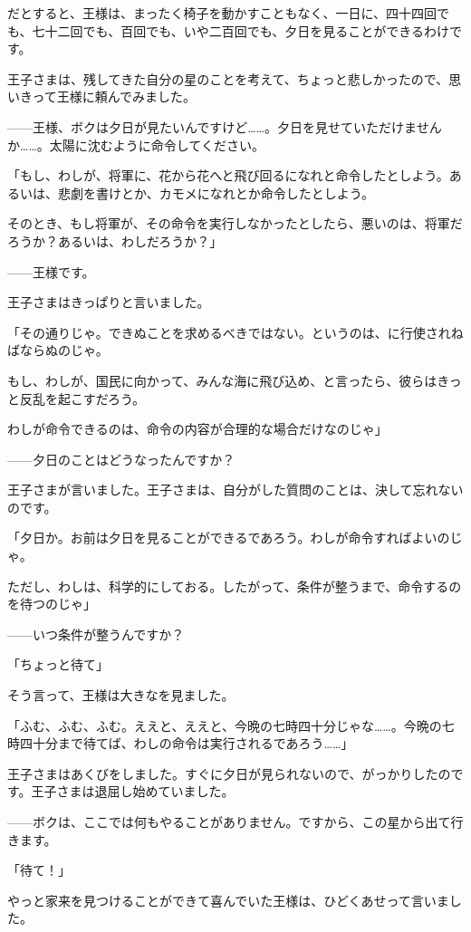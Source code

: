 だとすると、王様は、まったく椅子を動かすこともなく、一日に、四十四回でも、七十二回でも、百回でも、いや二百回でも、夕日を見ることができるわけです。

王子さまは、残してきた自分の星のことを考えて、ちょっと悲しかったので、思いきって王様に頼んでみました。

——王様、ボクは夕日が見たいんですけど……。夕日を見せていただけませんか……。太陽に沈むように命令してください。

「もし、わしが、将軍に、花から花へと飛び回るになれと命令したとしよう。あるいは、悲劇を書けとか、カモメになれとか命令したとしよう。

そのとき、もし将軍が、その命令を実行しなかったとしたら、悪いのは、将軍だろうか？あるいは、わしだろうか？」

——王様です。

王子さまはきっぱりと言いました。

「その通りじゃ。できぬことを求めるべきではない。というのは、に行使されねばならぬのじゃ。

もし、わしが、国民に向かって、みんな海に飛び込め、と言ったら、彼らはきっと反乱を起こすだろう。

わしが命令できるのは、命令の内容が合理的な場合だけなのじゃ」

——夕日のことはどうなったんですか？

王子さまが言いました。王子さまは、自分がした質問のことは、決して忘れないのです。

「夕日か。お前は夕日を見ることができるであろう。わしが命令すればよいのじゃ。

ただし、わしは、科学的にしておる。したがって、条件が整うまで、命令するのを待つのじゃ」

——いつ条件が整うんですか？

「ちょっと待て」

そう言って、王様は大きなを見ました。

「ふむ、ふむ、ふむ。ええと、ええと、今晩の七時四十分じゃな……。今晩の七時四十分まで待てば、わしの命令は実行されるであろう……」

王子さまはあくびをしました。すぐに夕日が見られないので、がっかりしたのです。王子さまは退屈し始めていました。


——ボクは、ここでは何もやることがありません。ですから、この星から出て行きます。

「待て！」

やっと家来を見つけることができて喜んでいた王様は、ひどくあせって言いました。

